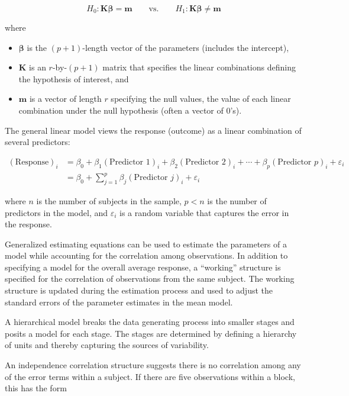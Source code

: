 \documentclass[
  letterpaper,
  DIV=11,
  numbers=noendperiod]{scrreprt}
\providecommand{\tightlist}{%
  \setlength{\itemsep}{0pt}\setlength{\parskip}{0pt}}\usepackage{longtable,booktabs,array}
\theoremstyle{definition}
\theoremstyle{definition}
\theoremstyle{remark}
\begin{document}
\[H_0: \mathbf{K}\boldsymbol{\beta} = \mathbf{m} \qquad \text{vs.} \qquad H_1: \mathbf{K}\boldsymbol{\beta} \neq \mathbf{m}\]

where

\begin{itemize}
\tightlist
\item
  \(\boldsymbol{\beta}\) is the \((p+1)\)-length vector of the
  parameters (includes the intercept),
\item
  \(\mathbf{K}\) is an \(r\)-by-\((p+1)\) matrix that specifies the
  linear combinations defining the hypothesis of interest, and
\item
  \(\mathbf{m}\) is a vector of length \(r\) specifying the null values,
  the value of each linear combination under the null hypothesis (often
  a vector of 0's).
\end{itemize}

\begin{description}
\tightlist
\item[General Linear Model (Definition~\ref{def-general-linear-model})]
The general linear model views the response (outcome) as a linear
combination of several predictors:
\end{description}

\[
\begin{aligned}
  (\text{Response})_i 
    &= \beta_0 + \beta_1 (\text{Predictor 1})_{i} + \beta_2 (\text{Predictor 2})_{i} + \dotsb + 
      \beta_p (\text{Predictor } p)_{i} + \varepsilon_i \\
    &= \beta_0 + \sum\limits_{j=1}^{p} \beta_j (\text{Predictor } j)_{i} + \varepsilon_i
\end{aligned}
\]

where \(n\) is the number of subjects in the sample, \(p < n\) is the
number of predictors in the model, and \(\varepsilon_i\) is a random
variable that captures the error in the response.

\begin{description}
\tightlist
\item[Generalized Estimating Equations (GEE) (Definition~\ref{def-gee})]
Generalized estimating equations can be used to estimate the parameters
of a model while accounting for the correlation among observations. In
addition to specifying a model for the overall average response, a
``working'' structure is specified for the correlation of observations
from the same subject. The working structure is updated during the
estimation process and used to adjust the standard errors of the
parameter estimates in the mean model.
\item[Hierarchical Model (Definition~\ref{def-hierarchical-model})]
A hierarchical model breaks the data generating process into smaller
stages and posits a model for each stage. The stages are determined by
defining a hierarchy of units and thereby capturing the sources of
variability.
\item[Independence Correlation Structure
(Definition~\ref{def-independence-correlation-structure})]
An independence correlation structure suggests there is no correlation
among any of the error terms within a subject. If there are five
observations within a block, this has the form
\end{description}
\end{document}
